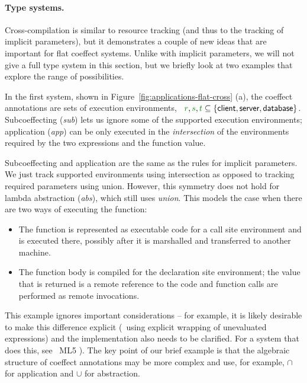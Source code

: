 \paragraph{Type systems.}

Cross-compilation is similar to resource tracking (and thus to the tracking of implicit
parameters), but it demonstrates a couple of new ideas that are important for flat coeffect
systems. Unlike with implicit parameters, we will not give a full type system in this
section, but we briefly look at two examples that explore the range of possibilities.

In the first system, shown in Figure~\ref{fig:applications-flat-cross} (a), the coeffect annotations
are sets of execution environments, \ie~$\cclrd{r}, \cclrd{s}, \cclrd{t} \subseteq \{ \ident{client},
\ident{server}, \ident{database} \}$. Subcoeffecting (\emph{sub}) lets us ignore some of the supported
execution environments; application (\emph{app}) can be only executed in the \emph{intersection} of the
environments required by the two expressions and the function value.

Subcoeffecting and application are the same as the rules for implicit parameters. We just track
supported environments using intersection as opposed to tracking required parameters using union.
However, this symmetry does not hold for lambda abstraction (\emph{abs}), which still uses \emph{union}.
This models the case when there are two ways of executing the function:
%
\begin{itemize}
\item The function is represented as executable code for a call site environment
  and is executed there, possibly after it is marshalled and transferred to another machine.
\vspace{-0.5em}
\item The function body is compiled for the declaration site environment; the value
  that is returned is a remote reference to the code and function calls are performed as remote invocations.
\end{itemize}
%
This example ignores important considerations -- for example, it is likely desirable to make this
difference explicit (\eg~using explicit wrapping of unevaluated expressions) and the implementation
also needs to be clarified. For a system that does this, see \eg~ML5 \cite{app-distributed-ml5}).
The key point of our brief example is that the algebraic structure of coeffect annotations may be more
complex and use, for example, $\cap$ for application and $\cup$ for abstraction.

